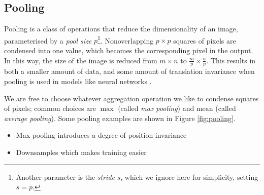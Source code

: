     \subsection{Pooling}
    \label{sec:pooling}

        Pooling is a class of operations that reduce the dimensionality of an
        image, parameterised by a \emph{pool size} $p$\footnote{Another
        parameter is the \emph{stride} $s$, which we ignore here for simplicity,
        setting $s = p$.}. Nonoverlapping $p \times p$ squares of pixels are
        condensed into one value, which becomes the corresponding pixel in the
        output. In this way, the size of the image is reduced from $m \times n$
        to $\frac{m}{p} \times \frac{n}{p}$. This results in both a smaller
        amount of data, and some amount of translation invariance when pooling
        is used in models like neural networks \citep{scherer10}.

        We are free to choose whatever aggregation operation we like to condense
        squares of pixels; common choices are $\max$ (called \emph{max pooling})
        and $\mbox{mean}$ (called \emph{average pooling}). Some pooling examples
        are shown in Figure \ref{fig:pooling}.

        \begin{itemize}
            \item Max pooling introduces a degree of position invariance
            \item Downsamples which makes training easier
        \end{itemize}
        
